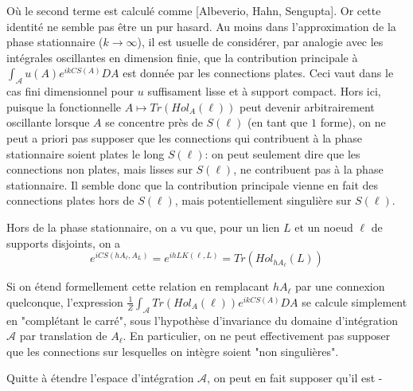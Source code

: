 \documentclass[10pt]{article}
\begin{document}
Où le second terme est calculé comme [Albeverio, Hahn, Sengupta]. Or cette identité ne semble pas être un pur hasard. Au moins dans l'approximation de la phase stationnaire ($k\to \infty$), il est usuelle de considérer, par analogie avec les intégrales oscillantes en dimension finie,  que la contribution principale à $\int_{\mathcal{A}} u(A) e^{i k CS(A)} DA $ est donnée par les connections plates. Ceci vaut dans le cas fini dimensionnel pour $u$ suffisament lisse et à support compact. Hors ici, puisque la fonctionnelle $A\mapsto Tr(Hol_A(\ell))$ peut devenir arbitrairement oscillante lorsque $A$ se concentre près de $S(\ell)$ (en tant que $1$ forme), on ne peut a priori pas supposer que les connections qui contribuent à la phase stationnaire soient plates le long $S(\ell)$: on peut seulement dire que les connections non plates, mais lisses sur $S(\ell)$, ne contribuent pas à la phase stationnaire. Il semble donc que la contribution principale vienne en fait des connections plates hors de $S(\ell)$, mais potentiellement singulière sur $S(\ell)$.

Hors de la phase stationnaire, on a vu que, pour un lien $L$ et un noeud $\ell$ de supports disjoints, on a\[e^{i CS(h A_\ell,A_{L}) }=e^{ih LK(\ell,L)}=Tr(Hol_{h A_\ell}(L))\]

Si on étend formellement cette relation en remplacant $h A_\ell$ par une connexion quelconque, l'expression $\frac{1}{Z}\int_{\mathcal{A}} Tr(Hol_A(\ell)) e^{i k CS(A)} DA$ se calcule simplement en "complétant le carré", sous l'hypothèse d'invariance du domaine d'intégration $\mathcal{A}$ par translation de $A_\ell$. En particulier, on ne peut effectivement pas supposer que les connections sur lesquelles on intègre soient "non singulières".

Quitte à étendre l'espace d'intégration $\mathcal{A}$, on peut en fait supposer qu'il est -
\end{document}
